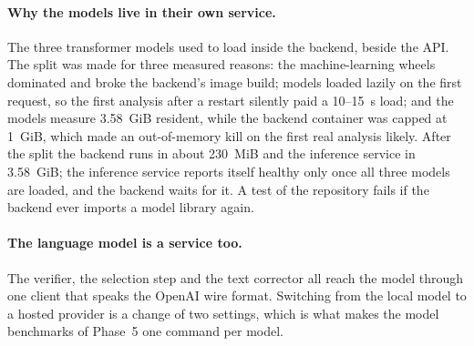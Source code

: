 \paragraph{Why the models live in their own service.} The three
transformer models used to load inside the backend, beside the API. The
split was made for three measured reasons: the machine-learning wheels
dominated and broke the backend's image build; models loaded lazily on
the first request, so the first analysis after a restart silently paid
a 10--15~s load; and the models measure 3.58~GiB resident, while the
backend container was capped at 1~GiB, which made an out-of-memory kill
on the first real analysis likely. After the split the backend runs in
about 230~MiB and the inference service in 3.58~GiB; the inference
service reports itself healthy only once all three models are loaded,
and the backend waits for it. A test of the repository fails if the
backend ever imports a model library again.

\paragraph{The language model is a service too.} The verifier, the
selection step and the text corrector all reach the model through one
client that speaks the OpenAI wire format. Switching from the local
model to a hosted provider is a change of two settings, which is what
makes the model benchmarks of Phase~5 one command per model.
